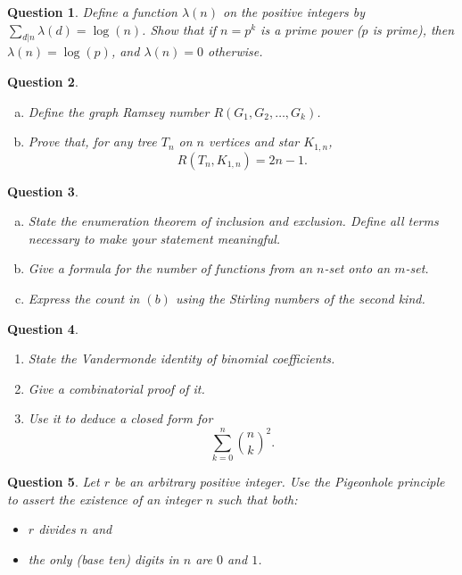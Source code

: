 \documentclass[12]{article}
\newtheorem{question}{Question}
\theoremstyle{definition}
\begin{document}
	\begin{question}
		Define a function $\lambda(n)$ on the positive integers by $\sum_{d|n} \lambda(d) = \log(n)$.  Show that if $n = p^k$ is a prime power ($p$ is prime), then $\lambda(n) = \log(p)$, and $\lambda(n) = 0$ otherwise.
	\end{question}

	\begin{question}
		\
		\begin{enumerate}[a)]
			\item Define the graph Ramsey number $R(G_1, G_2, \ldots, G_k)$.
			\item Prove that, for any tree $T_n$ on $n$ vertices and star $K_{1,n}$,
			$$R(T_n,K_{1,n}) = 2n-1.$$
		\end{enumerate}
	\end{question}

	\begin{question}
		\
		\begin{enumerate}[a)]
			\item State the enumeration theorem of inclusion and exclusion.  Define all terms necessary to make your statement meaningful.
			\item Give a formula for the number of functions from an $n$-set onto an $m$-set.
			\item Express the count in $(b)$ using the Stirling numbers of the second kind.
		\end{enumerate}
	
	\end{question}

	\begin{question}
		\
		\begin{enumerate}
			\item State the Vandermonde identity of binomial coefficients.
			\item Give a combinatorial proof of it.
			\item Use it to deduce a closed form for
			$$\sum_{k=0}^n {n \choose k}^2.$$
		\end{enumerate}
	\end{question}

	\begin{question}
		Let $r$ be an arbitrary positive integer.  Use the Pigeonhole principle to assert the existence of an integer $n$ such that both:
		\begin{itemize}
			\item $r$ divides $n$ and
			\item the only (base ten) digits in $n$ are $0$ and $1$.
		\end{itemize}
	\end{question}
\end{document}
